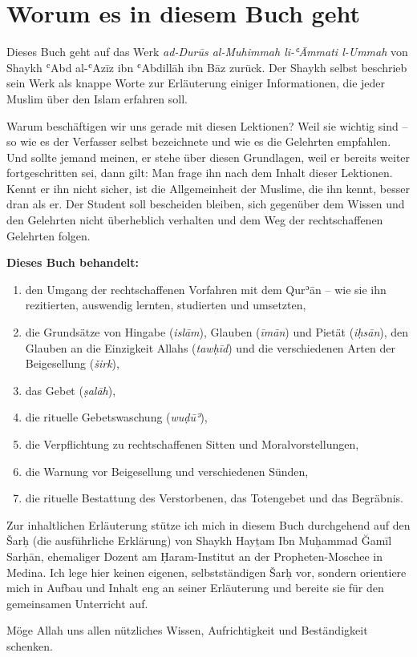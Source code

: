 \clearpage
\thispagestyle{plain}
\section*{Worum es in diesem Buch geht}

Dieses Buch geht auf das Werk \emph{ad-Durūs al-Muhimmah li-ʿĀmmati l-Ummah} von Shaykh
ʿAbd al-ʿAzīz ibn ʿAbdillāh ibn Bāz  zurück. Der Shaykh selbst beschrieb sein Werk
als knappe Worte zur Erläuterung einiger Informationen, die jeder Muslim über den Islam
erfahren soll.

Warum beschäftigen wir uns gerade mit diesen Lektionen? Weil sie wichtig sind – so wie es der
Verfasser selbst bezeichnete und wie es die Gelehrten empfahlen. Und sollte jemand meinen, er
stehe über diesen Grundlagen, weil er bereits weiter fortgeschritten sei, dann gilt: Man frage
ihn nach dem Inhalt dieser Lektionen. Kennt er ihn nicht sicher, ist die Allgemeinheit der
Muslime, die ihn kennt, besser dran als er. Der Student soll bescheiden bleiben, sich gegenüber
dem Wissen und den Gelehrten nicht überheblich verhalten und dem Weg der rechtschaffenen
Gelehrten folgen.

\textbf{Dieses Buch behandelt:}
\begin{enumerate}[leftmargin=1.6em]
  \item den Umgang der rechtschaffenen Vorfahren mit dem Qurʾān – wie sie ihn rezitierten,
        auswendig lernten, studierten und umsetzten,
  \item die Grundsätze von Hingabe (\emph{islām}), Glauben (\emph{īmān}) und Pietät
        (\emph{iḥsān}), den Glauben an die Einzigkeit Allahs (\emph{tawḥīd}) und die
        verschiedenen Arten der Beigesellung (\emph{širk}),
  \item das Gebet (\emph{ṣalāh}),
  \item die rituelle Gebetswaschung (\emph{wuḍūʾ}),
  \item die Verpflichtung zu rechtschaffenen Sitten und Moralvorstellungen,
  \item die Warnung vor Beigesellung und verschiedenen Sünden,
  \item die rituelle Bestattung des Verstorbenen, das Totengebet und das Begräbnis.
\end{enumerate}

Zur inhaltlichen Erläuterung stütze ich mich in diesem Buch durchgehend auf den Šarḥ (die
ausführliche Erklärung) von Shaykh Hayṯam Ibn Muḥammad Ğamīl Sarḥān, ehemaliger Dozent
am Ḥaram-Institut an der Propheten-Moschee in Medina. Ich lege hier keinen eigenen,
selbstständigen Šarḥ vor, sondern orientiere mich in Aufbau und Inhalt eng an seiner
Erläuterung und bereite sie für den gemeinsamen Unterricht auf.

Möge Allah  uns allen nützliches Wissen, Aufrichtigkeit und Beständigkeit schenken.
\clearpage
